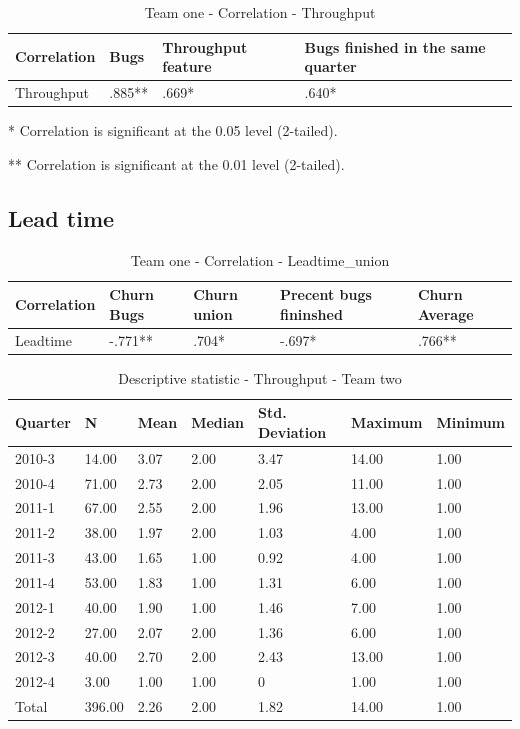 \documentclass[UKenglish]{ifimaster}  %
\begin{document}
\begin{table}[!htbp] 
 \centering 
 \begin{tabular}{|l|l|l|l|} 
\hline 
Correlation  & Bugs & Throughput feature & Bugs finished in the same quarter\\ \hline  %
	Throughput & .885** & .669* & .640* \\ \hline 

\end{tabular} 
 \caption{Team one - Correlation - Throughput} 
 \label{tc:2}
  \centerline {* Correlation is significant at the 0.05 level (2-tailed).}
      \centerline{  ** Correlation is significant at the 0.01 level (2-tailed).}
 \end{table} 
 \newpage
\subsection {Lead time}
\begin{table}[!htbp] 
 \centering 
 \begin{tabular}{|l|l|l|l|l|} 
\hline 
Correlation  & Churn Bugs & Churn union & Precent bugs fininshed & Churn Average \\ \hline 
	Leadtime & -.771** & .704* & -.697* & .766** \\ \hline
\end{tabular} 
 \caption{Team one - Correlation - 	Leadtime\_union} 
 \end{table}   
 
    \begin{table}[!htbp]
   \centering
 \begin{tabular}{ | l | l | l | l | l | l | l | }
\hline
	Quarter & N & Mean & Median & Std. Deviation & Maximum & Minimum \\ \hline
	2010-3 & 14.00 & 3.07 & 2.00 & 3.47 & 14.00 & 1.00\\ \hline
	2010-4 & 71.00 & 2.73 & 2.00 & 2.05 & 11.00 & 1.00\\ \hline
	2011-1 & 67.00 & 2.55 & 2.00 & 1.96 & 13.00 & 1.00\\ \hline
	2011-2 & 38.00 & 1.97 & 2.00 & 1.03 & 4.00 & 1.00\\ \hline
	2011-3 & 43.00 & 1.65 & 1.00 & 0.92 & 4.00 & 1.00\\ \hline
	2011-4 & 53.00 & 1.83 & 1.00 & 1.31 & 6.00 & 1.00\\ \hline
	2012-1 & 40.00 & 1.90 & 1.00 & 1.46 & 7.00 & 1.00\\ \hline
	2012-2 & 27.00 & 2.07 & 2.00 & 1.36 & 6.00 & 1.00\\ \hline
	2012-3 & 40.00 & 2.70 & 2.00 & 2.43 & 13.00 & 1.00\\ \hline
	2012-4 & 3.00 & 1.00 & 1.00 & 0 & 1.00 & 1.00\\ \hline
	Total & 396.00 & 2.26 & 2.00 & 1.82 & 14.00 & 1.00\\ \hline
	 \end{tabular}
  	  \caption{ Descriptive statistic - Throughput - Team two}%
\end{table}
 \newpage 
\end{document}
